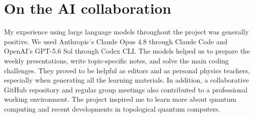%

\section{On the AI collaboration}
\label{sec:ai}

My experience using large language models throughout the project was generally
positive.  We used Anthropic's Claude Opus 4.8 through Claude Code and OpenAI's
GPT-5.6 Sol through Codex CLI.  The models helped us to prepare the weekly presentations,
write topic-specific notes, and solve the main coding challenges.  They proved to be helpful as
editors and as personal physics teachers, especially when generating all the learning materials.  In addition, a collaborative GitHub repository and regular
group meetings also contributed to a professional working environment.  The
project inspired me to learn more about quantum computing and recent
developments in topological quantum computers.
